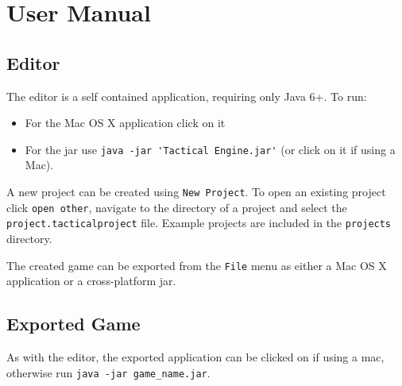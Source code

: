 \section{User Manual}

\subsection{Editor}
The editor is a self contained application, requiring only Java 6+.  To run:
\begin{itemize}
	\item For the Mac OS X application click on it
	\item For the jar use \lstinline{java -jar 'Tactical Engine.jar'} (or click on it if using a Mac).
\end{itemize}

\noindent A new project can be created using \texttt{New Project}. To open an existing project click \texttt{open other}, navigate to the directory of a project and select the \texttt{project.tacticalproject} file. Example projects are included in the \texttt{projects} directory.

The created game can be exported from the \texttt{File} menu as either a Mac OS X application or a cross-platform jar.

\subsection{Exported Game}
As with the editor, the exported application can be clicked on if using a mac, otherwise run \lstinline{java -jar game_name.jar}.

